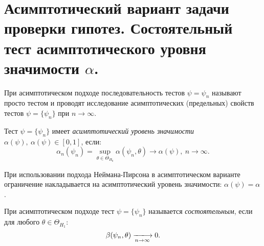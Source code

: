 \section{Асимптотический вариант задачи проверки гипотез. Состоятельный тест
асимптотического уровня значимости $\alpha$.}

При асимптотическом подходе последовательность тестов $\psi = \psi_n$
называют просто тестом и проводят исследование асимптотических (предельных)
свойств тестов $\psi = \{\psi_n\}$ при $n \to \infty$.\\

\begin{definition}
  Тест $\psi = \{\psi_n\}$ имеет \textit{асимптотический уровень
  значимости $\alpha(\psi),~ \alpha(\psi) \in \left[0, 1 \right]$}, если:
  \[
    \alpha_n(\psi_n) =
    \sup_{\theta \in \Theta_{H_0}} \alpha(\psi_n, \theta) \to
    \alpha(\psi),~ n \to \infty
  .\]
\end{definition}

При использовании подхода Неймана-Пирсона в асимптотическом варианте ограничение
накладывается на асимптотический уровень значимости: $\alpha(\psi) = \alpha$.

\begin{definition}
  При асимптотическом подходе тест $\psi = \{\psi_n\}$ называется
  \textit{состоятельным}, если для любого $\theta \in \Theta_{H_1}$:
  \[
    \beta(\psi_n, \theta) \xlongrightarrow[n \to \infty]{} 0
  .\]
\end{definition}

